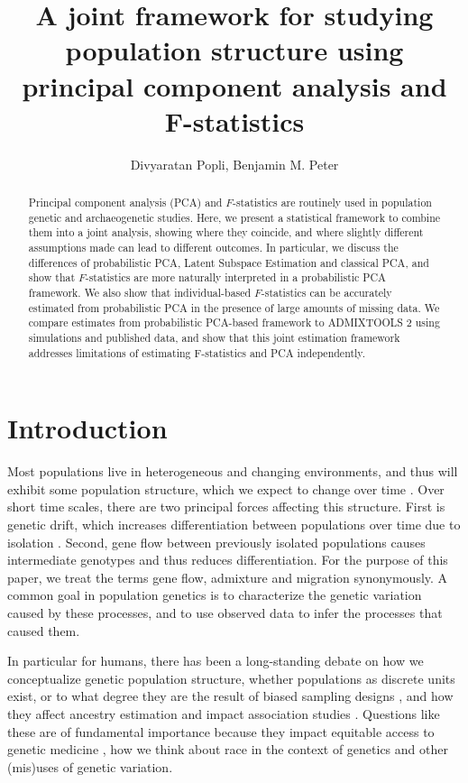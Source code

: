 \documentclass[12pt]{article}
\title{A joint framework for studying population structure using principal component analysis and F-statistics}
\author{Divyaratan Popli, Benjamin M. Peter}
\begin{document}
\maketitle


\begin{abstract}

\noindent Principal component analysis (PCA) and $F$-statistics are routinely used in population genetic and archaeogenetic studies.  Here, we present a statistical framework to combine them into a joint analysis, showing where they coincide, and where slightly different assumptions made can lead to different outcomes. In particular, we discuss the differences of probabilistic PCA, Latent Subspace Estimation and classical PCA, and show that $F$-statistics are more naturally interpreted in a probabilistic PCA framework. We also show that individual-based $F$-statistics can be accurately estimated from probabilistic PCA in the presence of large amounts of missing data. We compare estimates from probabilistic PCA-based framework to ADMIXTOOLS 2 using simulations and published data, and show that this joint estimation framework addresses limitations of estimating F-statistics and PCA independently.

\end{abstract}

\section{Introduction}

Most populations live in heterogeneous and changing environments, and thus will exhibit some population structure, which we expect to change over time \cite{charlesworth_effective_2009,allendorf_genetics_2017}. Over short time scales, there are two principal forces affecting this structure. First is genetic drift, which increases differentiation between populations over time due to isolation \cite{song_differentiation_2006}. Second, gene flow between previously isolated populations causes intermediate genotypes and thus reduces differentiation. For the purpose of this paper, we treat the terms gene flow, admixture and migration synonymously. A common goal in population genetics is to characterize the genetic variation caused by these processes, and to use observed data to infer the processes that caused them.

In particular for humans, there has been a long-standing debate on how we conceptualize genetic population structure, whether populations as discrete units exist, or to what degree they are the result of biased sampling designs \citep{serre_evidence_2004, rosenberg_clines_2005, peter_genetic_2020}, and how they affect ancestry estimation \citep{mathieson_what_2020, simon_contribution_2023} and impact association studies \citep{price_principal_2006}. Questions like these are of fundamental importance because they impact equitable access to genetic medicine \citep{popejoy_genomics_2016}, how we think about race in the context of genetics \citep{lewontin_apportionment_1972, novembre_background_2022} and other (mis)uses of genetic variation.
\end{document}
